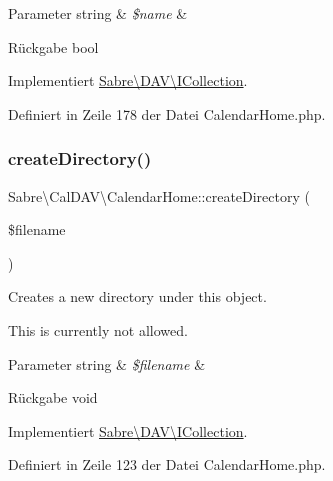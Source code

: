 \begin{DoxyParams}[1]{Parameter}
string & {\em \$name} & \\
\hline
\end{DoxyParams}
\begin{DoxyReturn}{Rückgabe}
bool 
\end{DoxyReturn}


Implementiert \mbox{\hyperlink{interface_sabre_1_1_d_a_v_1_1_i_collection_a81b44dc1354370890279af58c34c7375}{Sabre\textbackslash{}\+D\+A\+V\textbackslash{}\+I\+Collection}}.



Definiert in Zeile 178 der Datei Calendar\+Home.\+php.

\mbox{\label{class_sabre_1_1_cal_d_a_v_1_1_calendar_home_af17460f3f37b15f588e86d24a2c83d07}} 
\subsubsection{\texorpdfstring{create\+Directory()}{createDirectory()}}
{\footnotesize\ttfamily Sabre\textbackslash{}\+Cal\+D\+A\+V\textbackslash{}\+Calendar\+Home\+::create\+Directory (\begin{DoxyParamCaption}\item[{}]{\$filename }\end{DoxyParamCaption})}

Creates a new directory under this object.

This is currently not allowed.


\begin{DoxyParams}[1]{Parameter}
string & {\em \$filename} & \\
\hline
\end{DoxyParams}
\begin{DoxyReturn}{Rückgabe}
void 
\end{DoxyReturn}


Implementiert \mbox{\hyperlink{interface_sabre_1_1_d_a_v_1_1_i_collection_a11e8eb888fffe1d792acebbe5bc59243}{Sabre\textbackslash{}\+D\+A\+V\textbackslash{}\+I\+Collection}}.



Definiert in Zeile 123 der Datei Calendar\+Home.\+php.

